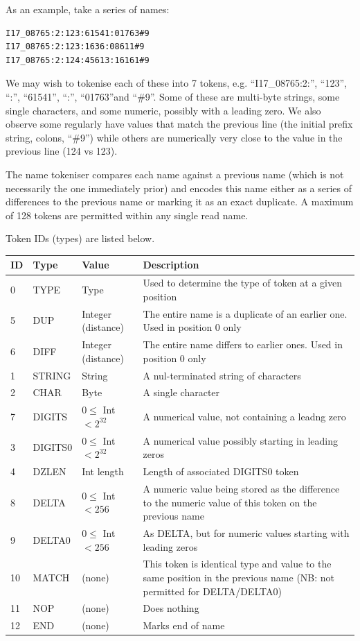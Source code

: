 \documentclass[a4paper]{article}
\begin{document}
As an example, take a series of names:

\begin{verbatim}
I17_08765:2:123:61541:01763#9
I17_08765:2:123:1636:08611#9
I17_08765:2:124:45613:16161#9
\end{verbatim}

We may wish to tokenise each of these into 7 tokens, e.g.
``I17\_08765:2:'', ``123'', ``:'', ``61541'', ``:'', ``01763''and
``\#9''. Some of these are multi-byte strings, some single characters,
and some numeric, possibly with a leading zero.  We also observe some
regularly have values that match the previous line (the initial prefix
string, colons, ``\#9'') while others are numerically very close to the
value in the previous line (124 vs 123).

The name tokeniser compares each name against a previous name (which
is not necessarily the one immediately prior) and encodes this name
either as a series of differences to the previous name or marking it
as an exact duplicate.  A maximum of 128 tokens are permitted within
any single read name.

Token IDs (types) are listed below.

\begin{tabular}{lllp{10cm}}
\hline
\textbf{ID} & \textbf{Type} & \textbf{Value} & \textbf{Description}\\
\hline
 0 & TYPE    & Type    & Used to determine the type of token at a given position \\
\hline
 5 & DUP     & Integer (distance) & The entire name is a duplicate of an earlier one.  Used in position 0 only\\
 6 & DIFF    & Integer (distance) & The entire name differs to earlier ones.  Used in position 0 only\\
\hline
 1 & STRING  & String  & A nul-terminated string of characters \\
 2 & CHAR    & Byte    & A single character \\
 7 & DIGITS  & $0 \le$ Int $< 2^{32}$ & A numerical value, not containing a leadng zero \\
 3 & DIGITS0 & $0 \le$ Int $< 2^{32}$ & A numerical value possibly starting in leading zeros \\
 4 & DZLEN   & Int length & Length of associated DIGITS0 token\\
 8 & DELTA  & $0 \le$ Int $< 256$   & A numeric value being stored as the difference to the numeric value of this token on the previous name \\
 9 & DELTA0 & $0 \le$ Int $< 256$ & As DELTA, but for numeric values starting with leading zeros \\
10 & MATCH   & (none) & This token is identical type and value to the same position in the previous name (NB: not permitted for DELTA/DELTA0)\\
11 & NOP & (none) & Does nothing\\
12 & END     & (none) & Marks end of name\\
\hline
\end{tabular}
\end{document}
